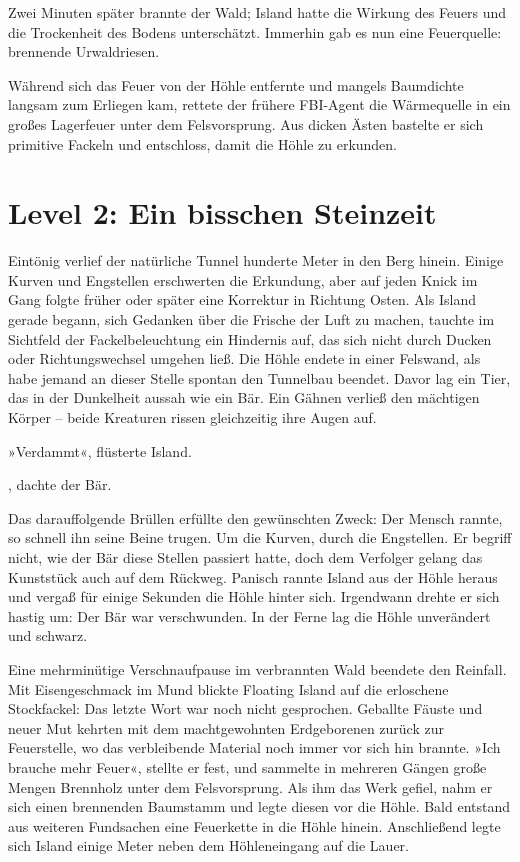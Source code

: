 Zwei Minuten später brannte der Wald; Island hatte die Wirkung des Feuers und die Trockenheit des Bodens unterschätzt. Immerhin gab es nun eine Feuerquelle: brennende Urwaldriesen.

Während sich das Feuer von der Höhle entfernte und mangels Baumdichte langsam zum Erliegen kam, rettete der frühere FBI-Agent die Wärmequelle in ein großes Lagerfeuer unter dem Felsvorsprung. Aus dicken Ästen bastelte er sich primitive Fackeln und entschloss, damit die Höhle zu erkunden.

\section{Level 2: Ein bisschen Steinzeit}

Eintönig verlief der natürliche Tunnel hunderte Meter in den Berg hinein. Einige Kurven und Engstellen erschwerten die Erkundung, aber auf jeden Knick im Gang folgte früher oder später eine Korrektur in Richtung Osten. Als Island gerade begann, sich Gedanken über die Frische der Luft zu machen, tauchte im Sichtfeld der Fackelbeleuchtung ein Hindernis auf, das sich nicht durch Ducken oder Richtungswechsel umgehen ließ. Die Höhle endete in einer Felswand, als habe jemand an dieser Stelle spontan den Tunnelbau beendet. Davor lag ein Tier, das in der Dunkelheit aussah wie ein Bär. Ein Gähnen verließ den mächtigen Körper – beide Kreaturen rissen gleichzeitig ihre Augen auf.

»Verdammt«, flüsterte Island.

, dachte der Bär. 

Das darauffolgende Brüllen erfüllte den gewünschten Zweck: Der Mensch rannte, so schnell ihn seine Beine trugen. Um die Kurven, durch die Engstellen. Er begriff nicht, wie der Bär diese Stellen passiert hatte, doch dem Verfolger gelang das Kunststück auch auf dem Rückweg. Panisch rannte Island aus der Höhle heraus und vergaß für einige Sekunden die Höhle hinter sich. Irgendwann drehte er sich hastig um: Der Bär war verschwunden. In der Ferne lag die Höhle unverändert und schwarz.

Eine mehrminütige Verschnaufpause im verbrannten Wald beendete den Reinfall. Mit Eisengeschmack im Mund blickte Floating Island auf die erloschene Stockfackel: Das letzte Wort war noch nicht gesprochen. Geballte Fäuste und neuer Mut kehrten mit dem machtgewohnten Erdgeborenen zurück zur Feuerstelle, wo das verbleibende Material noch immer vor sich hin brannte. »Ich brauche mehr Feuer«, stellte er fest, und sammelte in mehreren Gängen große Mengen Brennholz unter dem Felsvorsprung. Als ihm das Werk gefiel, nahm er sich einen brennenden Baumstamm und legte diesen vor die Höhle. Bald entstand aus weiteren Fundsachen eine Feuerkette in die Höhle hinein. Anschließend legte sich Island einige Meter neben dem Höhleneingang auf die Lauer.

